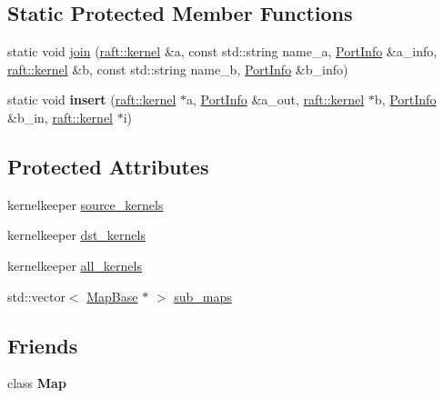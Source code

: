 \subsection*{Static Protected Member Functions}
\begin{DoxyCompactItemize}
\item 
static void \hyperlink{class_map_base_a2624d7b81f0078dcc78e524045403e28}{join} (\hyperlink{classraft_1_1kernel}{raft\+::kernel} \&a, const std\+::string name\+\_\+a, \hyperlink{struct_port_info}{Port\+Info} \&a\+\_\+info, \hyperlink{classraft_1_1kernel}{raft\+::kernel} \&b, const std\+::string name\+\_\+b, \hyperlink{struct_port_info}{Port\+Info} \&b\+\_\+info)
\item 
\hypertarget{class_map_base_a4c6452a79012d0a98eb6c406e008d87e}{}static void {\bfseries insert} (\hyperlink{classraft_1_1kernel}{raft\+::kernel} $\ast$a, \hyperlink{struct_port_info}{Port\+Info} \&a\+\_\+out, \hyperlink{classraft_1_1kernel}{raft\+::kernel} $\ast$b, \hyperlink{struct_port_info}{Port\+Info} \&b\+\_\+in, \hyperlink{classraft_1_1kernel}{raft\+::kernel} $\ast$i)\label{class_map_base_a4c6452a79012d0a98eb6c406e008d87e}

\end{DoxyCompactItemize}
\subsection*{Protected Attributes}
\begin{DoxyCompactItemize}
\item 
kernelkeeper \hyperlink{class_map_base_a2541cb37a237e66fc88129f9f0b02f50}{source\+\_\+kernels}
\item 
kernelkeeper \hyperlink{class_map_base_a83bb7ac6b0e80882356946d19da7ce4a}{dst\+\_\+kernels}
\item 
kernelkeeper \hyperlink{class_map_base_a2220cd630c5d00708f08d9bc70a48220}{all\+\_\+kernels}
\item 
std\+::vector$<$ \hyperlink{class_map_base}{Map\+Base} $\ast$ $>$ \hyperlink{class_map_base_abc4856ed552e77510211851f0a4a02ab}{sub\+\_\+maps}
\end{DoxyCompactItemize}
\subsection*{Friends}
\begin{DoxyCompactItemize}
\item 
\hypertarget{class_map_base_ad2f32e921244459f7cc6d50355429cc6}{}class {\bfseries Map}\label{class_map_base_ad2f32e921244459f7cc6d50355429cc6}

\end{DoxyCompactItemize}


